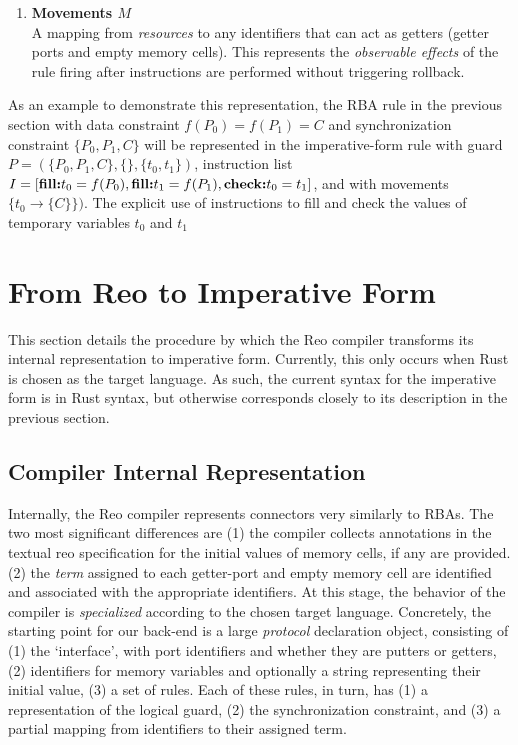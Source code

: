 \begin{enumerate}
	\item \textbf{Movements $M$}\\
	A mapping from \textit{resources} to any identifiers that can act as getters (getter ports and empty memory cells). This represents the \textit{observable effects} of the rule firing after instructions are performed without triggering rollback. 
\end{enumerate}

As an example to demonstrate this representation, the RBA rule in the previous section with data constraint $f(P_0)=f(P_1)=C$
 and synchronization constraint $\{P_0, P_1, C\}$ will be represented in the imperative-form rule with guard $P=(\{P_0, P_1, C\}, \{\}, \{t_0,t_1\})$, instruction list $I=[\text{\textbf{fill:}}t_0=f(P_0), \text{\textbf{fill:}}t_1=f(P_1), \text{\textbf{check:}}t_0=t_1]$, and with movements $\{t_0\rightarrow\{C\}\})$. The explicit use of instructions to fill and check the values of temporary variables $t_0$ and $t_1$

\section{From Reo to Imperative Form}
This section details the procedure by which the Reo compiler transforms its internal representation to imperative form. Currently, this only occurs when Rust is chosen as the target language. As such, the current syntax for the imperative form is in Rust syntax, but otherwise corresponds closely to its description in the previous section.

\subsection{Compiler Internal Representation}
Internally, the Reo compiler represents connectors very similarly to RBAs. The two most significant differences are (1) the compiler collects annotations in the textual reo specification for the initial values of memory cells, if any are provided. (2) the \textit{term} assigned to each getter-port and empty memory cell are identified and associated with the appropriate identifiers. At this stage, the behavior of the compiler is \textit{specialized} according to the chosen target language. Concretely, the starting point for our back-end is a large \textit{protocol} declaration object, consisting of (1) the `interface', with port identifiers and whether they are putters or getters, (2) identifiers for memory variables and optionally a string representing their initial value, (3) a set of rules. Each of these rules, in turn, has (1) a representation of the logical guard, (2) the synchronization constraint, and (3) a partial mapping from identifiers to their assigned term.

